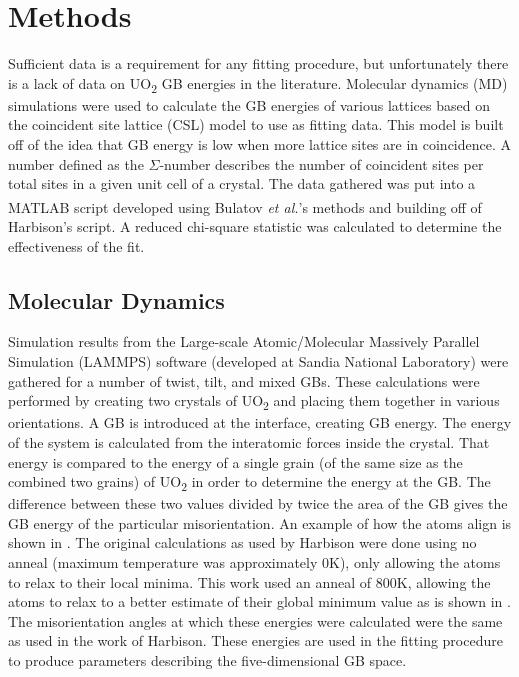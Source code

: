 \documentclass[12pt]{report}
\begin{document}
\chapter{Methods}
Sufficient data is a requirement for any fitting procedure, but unfortunately there is a lack of data on UO\textsubscript{2} GB energies in the literature.  Molecular dynamics (MD) simulations were used to calculate the GB energies of various lattices based on the coincident site lattice (CSL) model to use as fitting data. This model is built off of the idea that GB energy is low when more lattice sites are in coincidence.  A number defined as the $\Sigma$-number describes the number of coincident sites per total sites in a given unit cell of a crystal.\cite{lejcek2010, rohrer2011} The data gathered was put into a MATLAB\textsuperscript{\textregistered} script developed using Bulatov \emph{et al.}'s methods\cite{bulatov2014} and building off of Harbison's\cite{harbison2015} script.  A reduced chi-square statistic was calculated to determine the effectiveness of the fit.

\section{Molecular Dynamics}
Simulation results from the Large-scale Atomic/Molecular Massively Parallel Simulation (LAMMPS) software (developed at Sandia National Laboratory\cite{plimpton1995}) were gathered for a number of twist, tilt, and mixed GBs.  These calculations were performed by creating two crystals of UO\textsubscript{2} and placing them together in various orientations.  A GB is introduced at the interface, creating GB energy.  The energy of the system is calculated from the interatomic forces inside the crystal.  That energy is compared to the energy of a single grain (of the same size as the combined two grains) of UO\textsubscript{2} in order to determine the energy at the GB.\cite{harbison2015}  The difference between these two values divided by twice the area of the GB gives the GB energy of the particular misorientation.\cite{butterfield2013} An example of how the atoms align is shown in . The original calculations as used by Harbison \cite{harbison2015} were done using no anneal (maximum temperature was approximately 0K), only allowing the atoms to relax to their local minima.  This work used an anneal of 800K, %
allowing the atoms to relax to a better estimate of their global minimum value as is shown in .  
The misorientation angles at which these energies were calculated were the same as used in the work of Harbison.  These energies are used in the fitting procedure to produce parameters describing the five-dimensional GB space.
\end{document}
